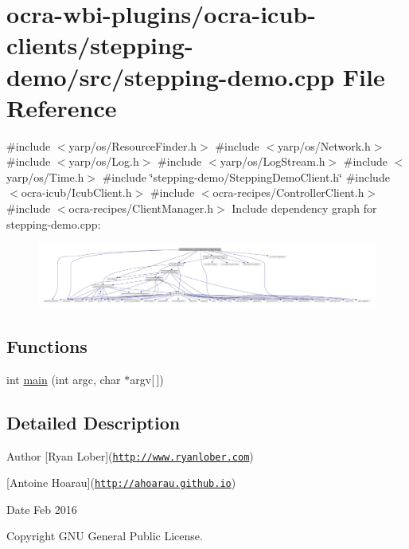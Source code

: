 \hypertarget{stepping-demo_8cpp}{\section{ocra-\/wbi-\/plugins/ocra-\/icub-\/clients/stepping-\/demo/src/stepping-\/demo.cpp \-File \-Reference}
\label{stepping-demo_8cpp}
}
{\ttfamily \#include $<$yarp/os/\-Resource\-Finder.\-h$>$}\*
{\ttfamily \#include $<$yarp/os/\-Network.\-h$>$}\*
{\ttfamily \#include $<$yarp/os/\-Log.\-h$>$}\*
{\ttfamily \#include $<$yarp/os/\-Log\-Stream.\-h$>$}\*
{\ttfamily \#include $<$yarp/os/\-Time.\-h$>$}\*
{\ttfamily \#include \char`\"{}stepping-\/demo/\-Stepping\-Demo\-Client.\-h\char`\"{}}\*
{\ttfamily \#include $<$ocra-\/icub/\-Icub\-Client.\-h$>$}\*
{\ttfamily \#include $<$ocra-\/recipes/\-Controller\-Client.\-h$>$}\*
{\ttfamily \#include $<$ocra-\/recipes/\-Client\-Manager.\-h$>$}\*
\-Include dependency graph for stepping-\/demo.cpp\-:
\nopagebreak
\begin{figure}[H]
\begin{center}
\leavevmode
\includegraphics[width=350pt]{stepping-demo_8cpp__incl}
\end{center}
\end{figure}
\subsection*{\-Functions}
\begin{DoxyCompactItemize}
\item 
int \hyperlink{stepping-demo_8cpp_a0ddf1224851353fc92bfbff6f499fa97}{main} (int argc, char $\ast$argv\mbox{[}$\,$\mbox{]})
\end{DoxyCompactItemize}


\subsection{\-Detailed \-Description}
\begin{DoxyAuthor}{\-Author}
\mbox{[}\-Ryan \-Lober\mbox{]}(\href{http://www.ryanlober.com}{\tt http\-://www.\-ryanlober.\-com}) 

\mbox{[}\-Antoine \-Hoarau\mbox{]}(\href{http://ahoarau.github.io}{\tt http\-://ahoarau.\-github.\-io}) 
\end{DoxyAuthor}
\begin{DoxyDate}{\-Date}
\-Feb 2016 
\end{DoxyDate}
\begin{DoxyCopyright}{\-Copyright}
\-G\-N\-U \-General \-Public \-License. 
\end{DoxyCopyright}


